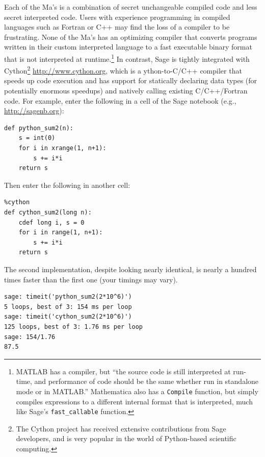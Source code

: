 \documentclass[multi]{cambridge7A}
\theoremstyle{plain}%
\theoremstyle{definition}
\begin{document}
Each of the Ma's is a combination of secret unchangeable compiled code
and less secret interpreted code.  Users with experience programming
in compiled languages such as Fortran or C++ may find the loss of a
compiler to be frustrating.
None of the Ma's has an optimizing compiler that converts programs
written in their custom interpreted language to a fast executable
binary format that is not interpreted at runtime.\footnote{MATLAB has a
  compiler, but
  ``the source code is still interpreted at run-time, and performance
  of code should be the same whether run in standalone mode or in
  MATLAB.''  Mathematica also has a {\tt Compile} function, but simply
  compiles expressions to a different internal format that is
  interpreted, much like Sage's {\tt fast\_callable} function.}  In
contrast, Sage is tightly integrated with Cython\footnote{The Cython
  project has received extensive contributions from Sage developers,
  and is very popular in the world of Python-based scientific
  computing.}  \url{http://www.cython.org}, which is a ython-to-C/C++
compiler that speeds up code execution and has support for statically
declaring data types (for potentially enormous speedups) and natively
calling existing C/C++/Fortran code.  For example, enter the following
in a cell of the Sage notebook (e.g., \url{http://sagenb.org}):
\begin{lstlisting}
def python_sum2(n):
    s = int(0)
    for i in xrange(1, n+1):
        s += i*i
    return s
\end{lstlisting}
Then enter the following in another cell:
\begin{lstlisting}
%cython
def cython_sum2(long n):
    cdef long i, s = 0
    for i in range(1, n+1):
        s += i*i
    return s
\end{lstlisting}
The second implementation, despite looking nearly identical, is nearly
a hundred times faster than the first one (your timings may vary).
\begin{lstlisting}
sage: timeit('python_sum2(2*10^6)')
5 loops, best of 3: 154 ms per loop
sage: timeit('cython_sum2(2*10^6)')
125 loops, best of 3: 1.76 ms per loop
sage: 154/1.76
87.5
\end{lstlisting}
\end{document}
